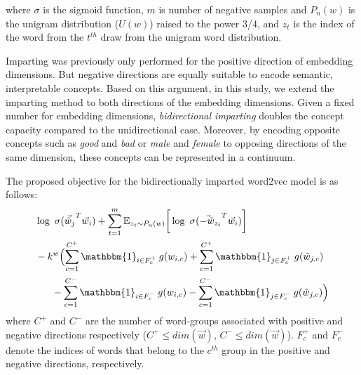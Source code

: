 \documentclass[11pt,a4paper]{article}
\newcommand{\indicator}{\ensuremath{\mathbbm{1}}}
\begin{document}
where $\sigma$ is the sigmoid function, $m$ is number of
negative samples and $P_n(w)$ is the unigram distribution
($U(w)$) raised to the power 3/4, and $z_t$ is the index of the word from the $t^{th}$ draw from the unigram word distribution.


Imparting was previously only performed
for the positive direction of embedding dimensions.
But negative directions are equally suitable to encode semantic, interpretable concepts. Based on this argument, in this study, we extend the imparting method to both directions of the embedding dimensions. 
Given a fixed number for embedding dimensions, \textit{bidirectional imparting} doubles the concept capacity compared to the unidirectional case. Moreover, by encoding opposite concepts such as \textit{good} and \textit{bad} or \textit{male} and \textit{female} to opposing directions of the same dimension, these concepts can be represented in a continuum.

The proposed objective for the bidirectionally imparted word2vec model is as follows:
\begin{align}
\begin{split}
& \log ~ \sigma ({\vec{\tilde{w}}_{j}}^T \vec{w}_{i}) + \sum_{t = 1}^{m} {\mathbb{E}}_{z_t \sim P_n(w)} \bigg[ \log ~ \sigma({\vec{-\tilde{w}}_{z_t}}^T \vec{w}_{i}) \bigg] \\ 
& -k^w \Bigl(  \sum_{c=1}^{C^+} \indicator_{i\in{}F^+_c} \: g(w_{i,c}) + \sum_{c=1}^{C^+} \indicator_{j \in F^+_c} \: g(\tilde{w}_{j,c}) \\
& ~~~~~ - \sum_{c=1}^{C^-} \indicator_{i\in{}F^-_c} \: g(w_{i,c}) - \sum_{c=1}^{C^-} \indicator_{j \in F^-_c} \: g(\tilde{w}_{j,c}) \Bigr)
\end{split}
\label{eq:word2vec_bi}
\end{align}
where $C^+$ and $C^-$ are the number of word-groups associated with positive and negative directions respectively ($C^+ \leq dim(\vec{w})$, $C^- \leq dim(\vec{w})$). $F^+_c$ and $F^-_c$ denote the indices of words that belong to the $c^{th}$ group in the positive and negative directions, respectively. 
\end{document}
